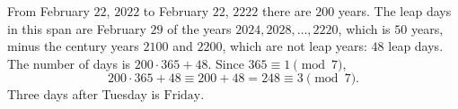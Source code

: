 From February $22$, $2022$ to February $22$, $2222$ there are $200$ years. The leap days in this span are February $29$ of the years $2024,2028,\dots,2220$, which is $50$ years, minus the century years $2100$ and $2200$, which are not leap years: $48$ leap days. The number of days is $200\cdot365+48$. Since $365\equiv1\pmod7$,
\[200\cdot365+48\equiv200+48=248\equiv3\pmod7.\]
Three days after Tuesday is $\boxed{\text{Friday}}$.
